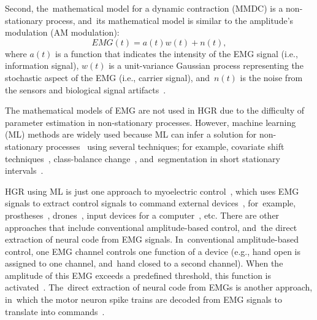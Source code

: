 \documentclass[sensors,review,accept,moreauthors,pdftex]{Definitions/mdpi}
\begin{document}
Second, the~mathematical model for a dynamic contraction (MMDC) is a non-stationary process, and~its mathematical model is similar to the amplitude's modulation (AM modulation):
\begin{equation}\label{eq:2}
EMG(t)=a(t)w(t)+n(t),
\end{equation}
where 
\begin{math}
a(t)
\end{math}
is a function that indicates the intensity of the EMG signal (i.e., information signal), 
\begin{math}
w(t)
\end{math} 
is a unit-variance Gaussian process representing the stochastic aspect of the EMG (i.e., carrier signal), and~\begin{math}
n(t)
\end{math}
is the noise from the sensors and biological signal artifacts~\cite{mcgill2004surface,shwedyk1977nonstationary}. 


The mathematical models of EMG are not used in HGR due to the difficulty of parameter estimation in non-stationary processes. However, machine learning (ML) methods are widely used because ML can infer a solution for non-stationary processes~\cite{sugiyama2012machine} using several techniques; for example, covariate shift techniques~\cite{sugiyama2012machine,sugiyama2013learning}, class-balance change~\cite{sugiyama2013learning}, and~segmentation in short stationary intervals~\cite{Merletti1997}. 



HGR using ML is just one approach to myoelectric control~\cite{farina2014extraction}, which uses EMG signals to extract control signals to command external devices~\cite{AsghariOskoei2007,parker2004control}, for~example, prostheses~\cite{Shi2018a}, drones~\cite{sarkar2016gesture}, input devices for a computer~\cite{itou2001mouse}, etc. There are other approaches that include conventional amplitude-based control, and~the direct extraction of neural code from EMG signals. In~conventional amplitude-based control, one EMG channel controls one function of a device (e.g., hand open is assigned to one channel, and~hand closed to a second channel). When the amplitude of this EMG exceeds a predefined threshold, this function is activated~\cite{aszmann2008selective,kuiken2006targeted,williams2004control,young2014comparison}. The~direct extraction of neural code from EMGs is another approach, in~which the motor neuron spike trains are decoded from EMG signals to translate into commands~\cite{farina2010decoding,dhillon2005direct,glaser2013real,gazzoni2004new}. 
\end{document}
